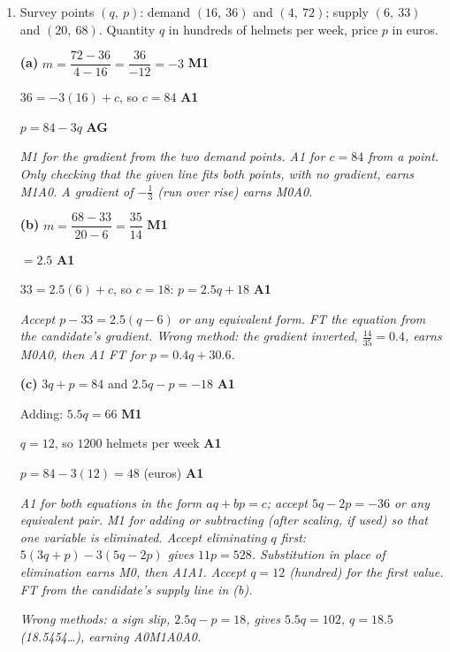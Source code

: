 \documentclass[12pt, twoside]{article}
\begin{document}
\begin{enumerate}[itemsep=0.3cm]
\newpage

\item[2.] [Maximum mark: 12]

Survey points $(q,\ p)$: demand $(16,\ 36)$ and $(4,\ 72)$; supply
$(6,\ 33)$ and $(20,\ 68)$. Quantity $q$ in hundreds of helmets per week,
price $p$ in euros.

\textbf{(a)} $m = \dfrac{72 - 36}{4 - 16} = \dfrac{36}{-12} = -3$
\hfill \textbf{M1}

$36 = -3(16) + c$, so $c = 84$ \hfill \textbf{A1}

$p = 84 - 3q$ \hfill \textbf{AG}

\emph{M1 for the gradient from the two demand points. A1 for $c = 84$
from a point. Only checking that the given line fits both points, with
no gradient, earns M1A0.
A gradient of $-\frac{1}{3}$ (run over rise) earns M0A0.}

\textbf{(b)} $m = \dfrac{68 - 33}{20 - 6} = \dfrac{35}{14}$ \hfill \textbf{M1}

$= 2.5$ \hfill \textbf{A1}

$33 = 2.5(6) + c$, so $c = 18$: \quad $p = 2.5q + 18$ \hfill \textbf{A1}

\emph{Accept $p - 33 = 2.5(q - 6)$ or any equivalent form. FT the
equation from the candidate's gradient. Wrong method: the gradient
inverted, $\frac{14}{35} = 0.4$, earns M0A0, then A1 FT for
$p = 0.4q + 30.6$.}

\textbf{(c)} $3q + p = 84$ and $2.5q - p = -18$ \hfill \textbf{A1}

Adding: $5.5q = 66$ \hfill \textbf{M1}

$q = 12$, so $1200$ helmets per week \hfill \textbf{A1}

$p = 84 - 3(12) = 48$ (euros) \hfill \textbf{A1}

\emph{A1 for both equations in the form $aq + bp = c$; accept
$5q - 2p = -36$ or any equivalent pair. M1 for adding or subtracting
(after scaling, if used) so that one variable is eliminated. Accept
eliminating $q$ first: $5(3q + p) - 3(5q - 2p)$ gives $11p = 528$.
Substitution in place of elimination earns M0, then A1A1. Accept $q = 12$
(hundred) for the first value. FT from the candidate's supply line
in (b).}

\emph{Wrong methods: a sign slip, $2.5q - p = 18$, gives $5.5q = 102$,
$q = 18.5$ (18.5454\ldots), earning A0M1A0A0.}


\end{enumerate}
\end{document}
